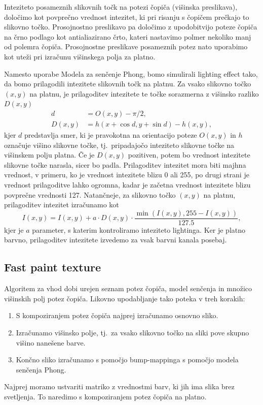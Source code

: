 Inteziteto posameznih slikovnih točk na potezi čopiča (višinska preslikava), določimo kot povprečno vrednost intezitet, ki pri risanju s čopičem prečkajo to slikovno točko. Prosojnostno preslikavo pa določimo z upodobitvijo poteze čopiča na črno podlago kot antialiazirano črto, kateri nastavimo polmer nekoliko manj od polemra čopiča. Prosojnostne preslikave posameznih potez nato uporabimo kot uteži pri izračunu višinskega polja za platno.

Namesto uporabe Modela za senčenje Phong, bomo simulirali lighting effect %
tako, da bomo prilagodili intezitete slikovnih točk na platnu. Za vsako slikovno točko $(x, y)$ na platnu, je prilagoditev intezitete te točke sorazmerna z višinsko razliko $D(x, y)$
%
\begin{align*}
d & = O(x, y) - \pi/2, \\
D(x, y) & = h(x + \cos d, y + \sin d) - h(x, y),
\end{align*}
%
kjer $d$ predstavlja smer, ki je pravokotna na orientacijo poteze $O(x, y)$ in  $h$ označuje višino slikovne točke, tj.\ pripadajočo inteziteto slikovne točke na višinskem polju platna. Če je $D(x, y)$ pozitiven, potem bo vrednost intezitete slikovne točke narasla, sicer bo padla. Prilagoditev intezitet mora biti majhna vrednost, v primeru, ko je vrednost intezitete blizu 0 ali 255, po drugi strani je vrednost prilagoditve lahko ogromna, kadar je začetna vrednost intezitete blizu povprečne vrednosti 127. Natančneje, za slikovno točko $(x, y)$ na platnu, prilagoditev intezitet izračunamo kot
$$
I(x, y) = I(x, y) + a \cdot D(x, y) \cdot \frac{\min (I(x, y), 255 - I(x, y))}{127.5},
$$
kjer je $a$ parameter, s katerim kontroliramo inteziteto lightinga. %
Ker je platno barvno, prilagoditev intezitete izvedemo za vsak barvni kanala posebaj.
%
\subsection{Fast paint texture}
Algoritem za vhod dobi urejen seznam potez čopiča, model senčenja in množico višinskih polj potez čopiča. Likovno upodabljanje tako poteka v treh korakih:
%
\begin{enumerate}
  \item S kompoziranjem potez čopiča najprej izračunamo osnovno sliko.
  \item Izračunamo višinsko polje, tj.\ za vsako slikovno točko na sliki pove skupno višino nanešene barve.
  \item Končno sliko izračunamo s pomočjo bump-mappinga s pomočjo modela senčenja Phong.
\end{enumerate}
%
Najprej moramo ustvariti matriko z vrednostmi barv, ki jih ima slika brez svetljenja. To naredimo s kompoziranjem potez čopiča na platno.

